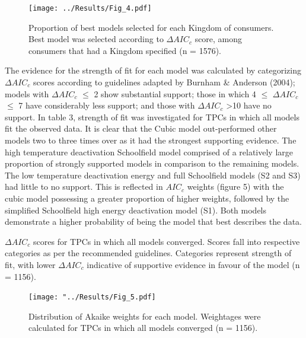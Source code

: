 \documentclass[11pt]{article}
\begin{document}
\begin{linenumbers}
\begin{figure}[H]	\texttt{[image: ../Results/Fig\_4.pdf]}
	\centering
	\caption{Proportion of  best models selected for each Kingdom of consumers. Best model was selected according to \(\Delta AIC_c\) score, among consumers that had a Kingdom specified (n = 1576).}
\end{figure}


The evidence for the strength of fit for each model was calculated by categorizing \(\Delta AIC_c\) scores according to guidelines adapted by Burnham \& Anderson (2004); models with \(\Delta AIC_c\) $\leq$ 2 show substantial support; those in which 4 $\leq$ \(\Delta AIC_c\) $\leq$ 7 have considerably less support; and those with \(\Delta AIC_c\) \textgreater 10 have no support. In table 3, strength of fit was investigated for TPCs in which all models fit the observed data. It is clear that the Cubic model out-performed other models two to three times over as it had the strongest supporting evidence. The high temperature deactivation Schoolfield model comprised of a relatively large proportion of strongly supported models in comparison to the remaining models. The low temperature deactivation energy and full Schoolfield models (S2 and S3) had little to no support. This is reflected in \(AIC_c\) weights (figure 5) with the cubic model possessing a greater proportion of higher weights, followed by the simplified Schoolfield high energy deactivation model (S1). Both models demonstrate a higher probability of being the model that best describes the data.

\vspace{0.7cm}
\begin{table}[H]
	\FloatBarrier
	\caption{\(\Delta AIC_c\) scores for TPCs in which all models converged.  Scores fall into respective categories as per the recommended guidelines. Categories represent strength of fit, with lower \(\Delta AIC_c\) indicative of supportive evidence in favour of the model (n = 1156).}
\begin{adjustbox}{height = 2.7cm, width=15cm}
		\centering
	
	\FloatBarrier
\end{adjustbox}
\end{table}




\begin{figure}[H]
	\texttt{[image: "../Results/Fig\_5.pdf]}
	\centering
	\caption{Distribution of Akaike weights for each model. Weightages were calculated for TPCs in which all models converged (n = 1156).}
\end{figure}


\end{linenumbers}
\end{document}
